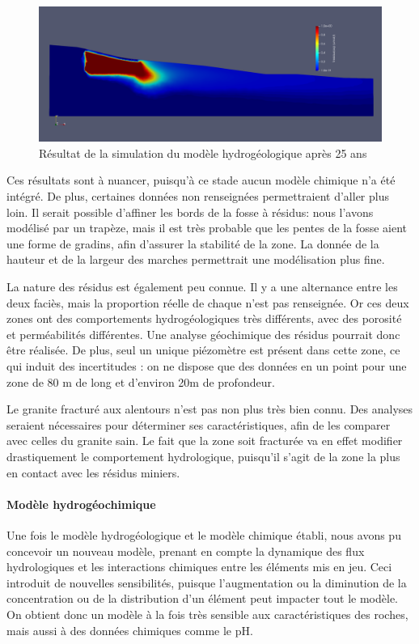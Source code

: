 \documentclass{article}
\begin{document}
\begin{figure}[!h]
    \centering
    \includegraphics[width=0.8\linewidth]{III_B_3_5.png}
    \caption{Résultat de la simulation du modèle hydrogéologique après 25 ans}
    \label{hytec_hydro_25ans}
\end{figure}

Ces résultats sont à nuancer, puisqu’à ce stade aucun modèle chimique n’a été intégré. De plus, certaines données non renseignées permettraient d’aller plus loin. Il serait possible d’affiner les bords de la fosse à résidus: nous l’avons modélisé par un trapèze, mais il est très probable que les pentes de la fosse aient une forme de gradins, afin d’assurer la stabilité de la zone. La donnée de la hauteur et de la largeur des marches permettrait une modélisation plus fine.

La nature des résidus est également peu connue. Il y a une alternance entre les deux faciès, mais la proportion réelle de chaque n’est pas renseignée. Or ces deux zones ont des comportements hydrogéologiques très différents, avec des porosité et perméabilités différentes. Une analyse géochimique des résidus pourrait donc être réalisée. De plus, seul un unique piézomètre est présent dans cette zone, ce qui induit des incertitudes : on ne dispose que des données en un point pour une zone de 80 m de long et d’environ 20m de profondeur.

Le granite fracturé aux alentours n’est pas non plus très bien connu. Des analyses seraient nécessaires pour déterminer ses caractéristiques, afin de les comparer avec celles du granite sain. Le fait que la zone soit fracturée va en effet modifier drastiquement le comportement hydrologique, puisqu’il s’agit de la zone la plus en contact avec les résidus miniers.

\paragraph{Modèle hydrogéochimique}

Une fois le modèle hydrogéologique et le modèle chimique établi, nous avons pu concevoir un nouveau modèle, prenant en compte la dynamique des flux hydrologiques et les interactions chimiques entre les éléments mis en jeu. Ceci introduit de nouvelles sensibilités, puisque l’augmentation ou la diminution de la concentration ou de la distribution d’un élément peut impacter tout le modèle. On obtient donc un modèle à la fois très sensible aux caractéristiques des roches, mais aussi à des données chimiques comme le pH.
\end{document}
